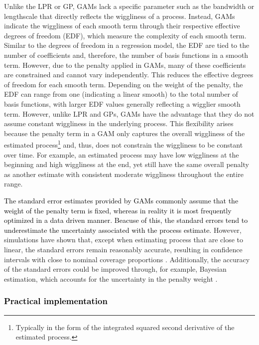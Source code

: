 \documentclass[man, floatsintext]{apa7}
\begin{document}
Unlike the LPR or GP, GAMs lack a specific parameter such as the bandwidth or
lengthscale that directly reflects the wiggliness of a process.
Instead, GAMs indicate the wiggliness of each smooth term through their
respective effective degrees of freedom (EDF), which measure the complexity of
each smooth term. Similar to the degrees of freedom in a regression model, the
EDF are tied to the number of coefficients and, therefore, the number of basis
functions in a smooth term. However, due to the penalty applied in GAMs, many
of these coefficients are constrained and cannot vary independently. This
reduces the effective degrees of freedom for each smooth term. Depending on the
weight of the penalty, the EDF can range from one (indicating a linear smooth)
to the total number of basis functions, with larger EDF values generally
reflecting a wigglier smooth term. However, unlike LPR and GPs, GAMs have the
advantage that they do not assume constant wiggliness in the underlying
process. This flexibility arises because the penalty term in a GAM only
captures the overall wiggliness of the estimated process\footnote{Typically in
  the form of the integrated squared second derivative of the estimated
  process.}
and, thus, does not constrain the wiggliness to be constant over time. For
example, an estimated process may have low wiggliness at the beginning and high
wiggliness at the end, yet still have the same overall penalty as another
estimate with consistent moderate wiggliness throughout the entire range.

\textcolor{black}{
  The standard error estimates provided by GAMs commonly assume that the weight
  of the penalty term is fixed, whereas in reality it is most frequently
  optimized in a data driven manner. Beacuse of this, the standard errors
  tend to underestimate the uncertainty associated with the process estimate.}
However, simulations have shown that,
except when estimating process that are close to linear, the standard errors
remain reasonably accurate, resulting in confidence intervals with close to
nominal coverage proportions \parencite{marra_coverage_2012}. Additionally, the
accuracy of the standard errors could be improved through, for example,
Bayesian estimation, which accounts for the uncertainty in the penalty weight
\parencite{wood_generalized_2006}.

\subsubsection{\textcolor{black}{Practical implementation}}
\end{document}
